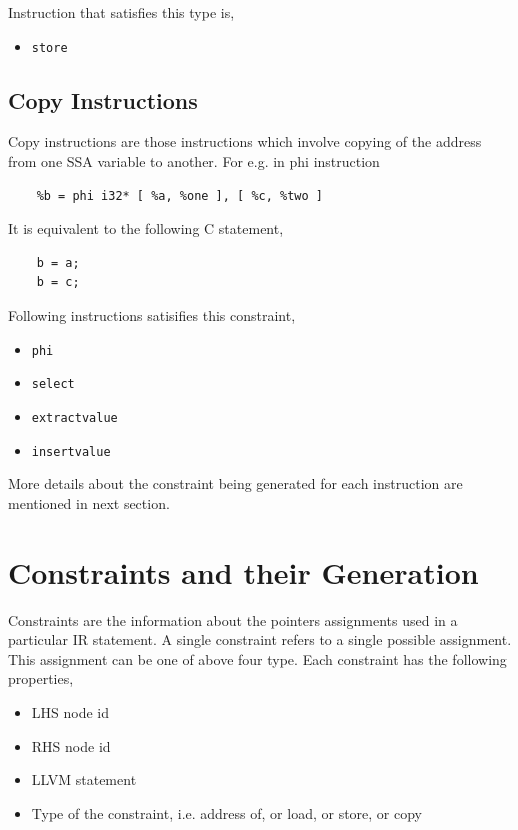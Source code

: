 \documentclass[a4paper,12pt]{report}
\begin{document}
\noindent
Instruction that satisfies this type is,
\begin{itemize}
 \item \texttt{store}
\end{itemize}


\subsection{Copy Instructions}
Copy instructions are those instructions which involve copying of the address 
from one SSA variable to another. For e.g. in phi instruction
\begin{lstlisting}
    %b = phi i32* [ %a, %one ], [ %c, %two ]
\end{lstlisting}

\noindent
It is equivalent to the following C statement,
\begin{lstlisting}
    b = a;
    b = c;
\end{lstlisting}

\noindent
Following instructions satisifies this constraint,
\begin{itemize}
    \item \texttt{phi}
    \item \texttt{select}
    \item \texttt{extractvalue}
    \item \texttt{insertvalue}
\end{itemize}

More details about the constraint being generated for each instruction are
mentioned in next section.

\section{Constraints and their Generation}
Constraints are the information about the pointers assignments used in a 
particular IR statement. A single constraint refers to a single possible 
assignment. This assignment can be one of above four type. Each constraint has 
the following properties,

\begin{itemize}
    \item LHS node id
    \item RHS node id
    \item LLVM statement
    \item Type of the constraint, i.e. address of, or load, or store, or copy
\end{itemize}
\end{document}
